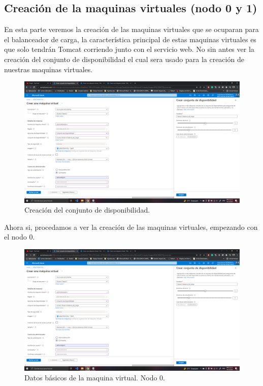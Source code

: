 \documentclass[11pt]{article}
\begin{document}
		\subsection{Creación de la maquinas virtuales (nodo 0 y 1)}
		En esta parte veremos la creación de las maquinas virtuales que se ocuparan para el balanceador de carga, la característica principal de estas maquinas virtuales es que solo tendrán Tomcat corriendo junto con el servicio web. No sin antes ver la creación del conjunto de disponibilidad el cual sera usado para la creación de nuestras maquinas virtuales.
		\begin{figure}[H]
			\centering
			\includegraphics[scale=0.34]{resources/CreacionConjuntoDisponibilidad.png}
			\caption{Creación del conjunto de disponibilidad.}\label{fig:picture}
		\end{figure}
		Ahora si, procedamos a ver la creación de las maquinas virtuales, empezando con el nodo 0.
		\begin{figure}[H]
			\centering
			\includegraphics[scale=0.34]{resources/CreacionConjuntoDisponibilidad.png}
			\caption{Datos básicos de la maquina virtual. Nodo 0.}\label{fig:picture}
		\end{figure}
\end{document}

